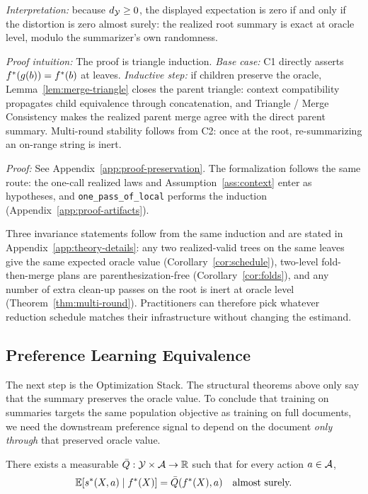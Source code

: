 \noindent\textit{Interpretation:} because $d_{\mathcal{Y}} \ge 0$, the displayed expectation is zero if and only if the distortion is zero almost surely: the realized root summary is exact at oracle level, modulo the summarizer's own randomness.

\noindent\textit{Proof intuition:} The proof is triangle induction. \emph{Base case:} C1 directly asserts $f^\ast(g(b)) = f^\ast(b)$ at leaves. \emph{Inductive step:} if children preserve the oracle, Lemma~\ref{lem:merge-triangle} closes the parent triangle: context compatibility propagates child equivalence through concatenation, and Triangle / Merge Consistency makes the realized parent merge agree with the direct parent summary. Multi-round stability follows from C2: once at the root, re-summarizing an on-range string is inert.

\noindent\textit{Proof:} See Appendix~\ref{app:proof-preservation}. The formalization follows the same route: the one-call realized laws and Assumption~\ref{ass:context} enter as hypotheses, and \texttt{one\_pass\_of\_local} performs the induction (Appendix~\ref{app:proof-artifacts}).

Three invariance statements follow from the same induction and are
stated in Appendix~\ref{app:theory-details}: any two realized-valid
trees on the same leaves give the same expected oracle value
(Corollary~\ref{cor:schedule}), two-level fold-then-merge plans are
parenthesization-free (Corollary~\ref{cor:folds}), and any number of
extra clean-up passes on the root is inert at oracle level
(Theorem~\ref{thm:multi-round}). Practitioners can therefore pick
whatever reduction schedule matches their infrastructure without
changing the estimand.

\subsection{Preference Learning Equivalence}

The next step is the Optimization Stack. The structural theorems above only say that the summary preserves the oracle value. To conclude that training on summaries targets the same population objective as training on full documents, we need the downstream preference signal to depend on the document \emph{only through} that preserved oracle value.

\begin{assumption}\label{ass:CF}
There exists a measurable $\bar{Q}: \mathcal{Y} \times \mathcal{A} \to \mathbb{R}$ such that for every action $a \in \mathcal{A}$,
\[
\mathbb{E}\!\left[s^\ast(X, a) \mid f^\ast(X)\right] = \bar{Q}(f^\ast(X), a) \quad \text{almost surely.}
\]
\end{assumption}

